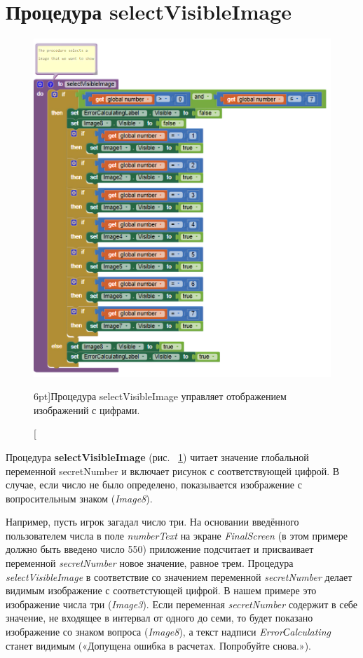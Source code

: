 \section{Процедура selectVisibleImage}

\begin{figure}
  \includegraphics{./graphics/programs/guess_numbers/procedure_selectVisibleImage_AppInventor_2018.png}
    \caption[Процедура selectVisibleImage.][6pt]{Процедура selectVisibleImage управляет отображением изображений с цифрами.}
  \label{fig:block:click:select:visible:image}
\end{figure}

Процедура \textbf{selectVisibleImage} (рис. ~\ref{fig:block:click:select:visible:image}) читает значение глобальной переменной secretNumber и включает рисунок с соответствующей цифрой.
В случае, если число не было определено, показывается изображение с вопросительным знаком (\textit{Image8}).

Например, пусть игрок загадал число три. На основании введённого пользователем числа в поле \textit{numberText} на экране \textit{FinalScreen} (в этом примере должно быть введено число 550) приложение подсчитает и присваивает переменной \textit{secretNumber} новое значение, равное трем. Процедура \textit{selectVisibleImage} в соответствие со значением переменной \textit{secretNumber} делает видимым изображение с соответстующей цифрой. 
В нашем примере это изображение числа три (\textit{Image3}). Если переменная \textit{secretNumber} содержит в себе значение, не входящее в интервал от одного до семи, то будет показано изображение со знаком вопроса (\textit{Image8}), а текст надписи \textit{ErrorСalculating} станет видимым («Допущена ошибка в расчетах. Попробуйте снова.»).


